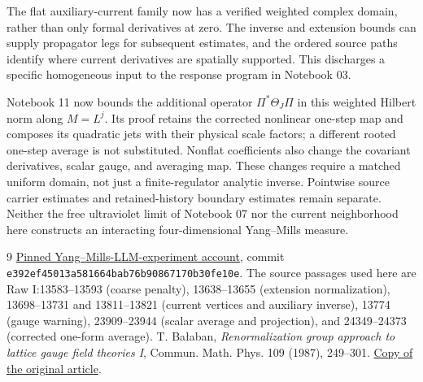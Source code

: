 \documentclass[11pt]{article}
\theoremstyle{remark}
\begin{document}
The flat auxiliary-current family now has a verified weighted
complex domain, rather than only formal derivatives at zero.
The inverse and extension bounds can supply propagator legs for
subsequent estimates, and the ordered source paths identify where
current derivatives are spatially supported. This discharges a
specific homogeneous input to the response program in Notebook 03.

Notebook 11 now bounds the additional operator $\Pi^*\Theta_J\Pi$
in this weighted Hilbert norm along $M=L^j$. Its proof retains the
corrected nonlinear one-step map and composes its quadratic jets
with their physical scale factors; a different rooted one-step
average is not substituted. Nonflat coefficients also change the covariant derivatives,
scalar gauge, and averaging map. These changes require a matched
uniform domain, not just a finite-regulator analytic inverse.
Pointwise source carrier estimates and retained-history boundary
estimates remain separate. Neither the free ultraviolet limit of
Notebook 07 nor the current neighborhood here constructs an
interacting four-dimensional Yang--Mills measure.

\begin{thebibliography}{9}
\href{https://github.com/ethanwsussman/Yang--Mills-LLM-experiment/tree/e392ef45013a581664bab76b90867170b30fe10e}
{Pinned Yang--Mills-LLM-experiment account}, commit
\texttt{e392ef45013a581664bab76b90867170b30fe10e}.
The source passages used here are Raw I:13583--13593
(coarse penalty), 13638--13655 (extension normalization),
13698--13731 and 13811--13821 (current vertices and auxiliary inverse),
13774 (gauge warning), 23909--23944 (scalar average and projection),
and 24349--24373 (corrected one-form average).
 T. Ba\l aban,
\emph{Renormalization group approach to lattice gauge field theories I},
Commun. Math. Phys. 109 (1987), 249--301.
\href{https://scispace.com/pdf/renormalization-group-approach-to-lattice-gauge-field-3ygai0vxt1.pdf}
{Copy of the original article}.
\end{thebibliography}
\end{document}
